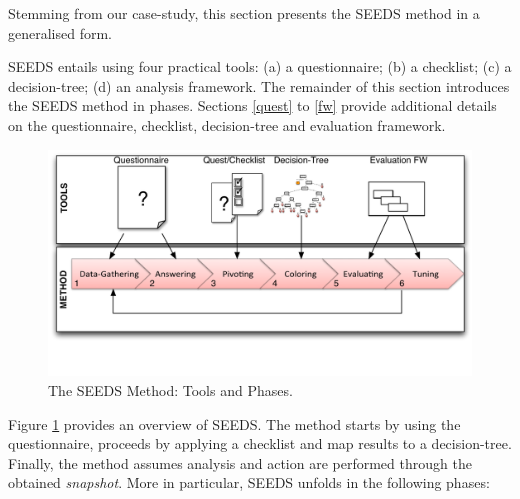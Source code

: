 
Stemming from our case-study, this section presents the SEEDS method in a generalised form. 

SEEDS entails using four practical tools: (a) a questionnaire; (b) a checklist; (c) a decision-tree; (d) an analysis framework. The remainder of this section introduces the SEEDS method in phases. Sections \ref{quest} to \ref{fw} provide additional details on the questionnaire, checklist, decision-tree and evaluation framework.
%

 \begin{figure}[h!]
\includegraphics[width=5.3in]{odessamethod}%
\caption{The SEEDS Method: Tools and Phases.}\label{SEEDS}
\end{figure}
Figure \ref{SEEDS} provides an overview of SEEDS. The method starts by using the questionnaire, proceeds by applying a checklist and map results to a decision-tree. Finally, the method assumes analysis and action are performed through the obtained \emph{snapshot}.
More in particular, SEEDS unfolds in the following phases:

